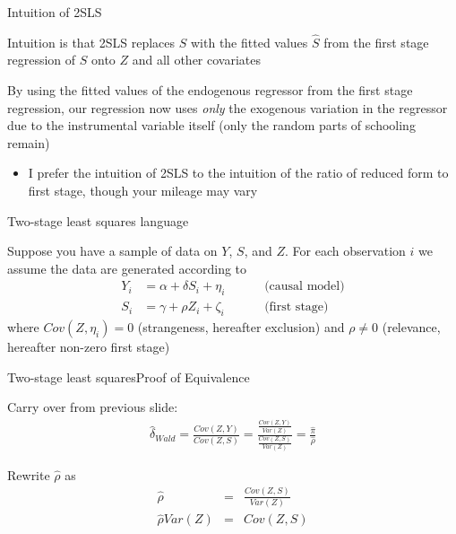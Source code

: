 \documentclass{beamer}
\begin{document}
\begin{frame}{Intuition of 2SLS}

  Intuition is that 2SLS replaces $S$ with the fitted values $\widehat{S}$ from the first stage regression of $S$ onto $Z$ and all other covariates

  \bigskip
  By using the fitted values of the endogenous regressor from the first stage regression, our regression now uses \emph{only} the exogenous variation in the regressor due to the instrumental variable itself (only the random parts of schooling remain)
  \begin{itemize}
    \item I prefer the intuition of 2SLS to the intuition of the ratio of reduced form to first stage, though your mileage may vary
  \end{itemize}
\end{frame}

\begin{frame}{Two-stage least squares language}

  Suppose you have a sample of data on $Y$, $S$, and $Z$. For each observation $i$ we assume the data are generated according to
  \begin{eqnarray*}
    Y_i &= \alpha + \delta{S}_i + \eta_i \quad\quad&\text{ (causal model)}\\
    S_i &= \gamma + \rho{Z}_i + \zeta_i \quad\quad&\text{ (first stage)}
  \end{eqnarray*}where $Cov(Z,\eta_i)=0$ (strangeness, hereafter exclusion) and $\rho\neq{0}$ (relevance, hereafter non-zero first stage)

\end{frame}

\begin{frame}{Two-stage least squares}{Proof of Equivalence}

  Carry over from previous slide:
  \begin{eqnarray*}
    \widehat{\delta}_{Wald} = \frac{ Cov(Z,Y)} {Cov(Z,S)} = \frac{ \frac{Cov(Z,Y)}{Var(Z)}}{ \frac{Cov(Z,S)}{Var(Z)}} = \frac{\widehat{\pi}}{\widehat{\rho}}
  \end{eqnarray*}

  Rewrite $\widehat{\rho}$ as
  \begin{eqnarray*}
    \widehat{\rho} &=&  \frac{Cov(Z,S)}{Var(Z)} \\
    \widehat{\rho} Var(Z) &=& Cov(Z,S)
  \end{eqnarray*}

\end{frame}
\end{document}
